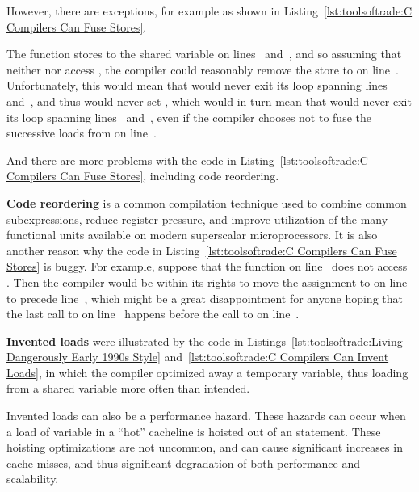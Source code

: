 However, there are exceptions, for example as shown in
Listing~\ref{lst:toolsoftrade:C Compilers Can Fuse Stores}.
\begin{lineref}
The function  stores to the shared
variable  on lines~ and~,
and so assuming that neither
 nor  access ,
the compiler could reasonably remove the store to  on
line~.
Unfortunately, this would mean that  would
never exit its loop spanning
lines~ and~, and thus would never set
, which would in turn mean that 
would never exit its loop spanning
lines~ and~, even if
the compiler chooses not to fuse the successive loads from
 on line~.

And there are more problems with the code in
Listing~\ref{lst:toolsoftrade:C Compilers Can Fuse Stores},
including code reordering.

{\bf Code reordering} is a common compilation technique used to
combine common subexpressions, reduce register pressure, and
improve utilization of the many functional units available on
modern superscalar microprocessors.
It is also another reason why the code in
Listing~\ref{lst:toolsoftrade:C Compilers Can Fuse Stores}
is buggy.
For example, suppose that the  function on
line~
does not access .
Then the compiler would be within its rights to move the assignment
to  on
line~ to precede line~, which might
be a great disappointment for anyone hoping that the last call to
 on line~ happens before the call to
 on line~.
\end{lineref}

{\bf Invented loads} were illustrated by the code in
Listings~\ref{lst:toolsoftrade:Living Dangerously Early 1990s Style}
and~\ref{lst:toolsoftrade:C Compilers Can Invent Loads},
in which the compiler optimized away a temporary variable,
thus loading from a shared variable more often than intended.

Invented loads can also be a performance hazard.
These hazards can occur when a load of variable in a ``hot''
cacheline is hoisted out of an  statement.
These hoisting optimizations are not uncommon, and can cause significant
increases in cache misses, and thus significant degradation of
both performance and scalability.

